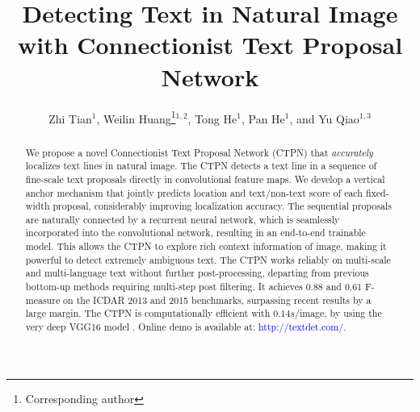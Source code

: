 \documentclass[runningheads]{llncs}
\begin{document}
\pagestyle{headings}
\mainmatter

\title{Detecting Text in Natural Image with Connectionist Text Proposal  Network} %



\author{Zhi Tian$^1$, Weilin Huang\thanks{Corresponding author}$^{1,2}$, Tong He$^1$, Pan He$^1$,  and Yu Qiao$^{1,3}$}



\maketitle

\begin{abstract}
We propose a novel Connectionist Text Proposal Network (CTPN) that  \textit{accurately} localizes text lines in natural image.  The CTPN detects a text line in a sequence of  fine-scale text proposals directly in convolutional feature maps.  We develop a vertical anchor mechanism that jointly predicts  location and text/non-text score  of each fixed-width proposal,   considerably improving localization accuracy. The sequential proposals  are naturally connected by a recurrent neural network, which is seamlessly incorporated into the convolutional network, resulting in an end-to-end trainable model. This allows the CTPN to explore rich context information of image, making it powerful to detect extremely ambiguous text.
The CTPN works reliably on multi-scale and multi-language text without further post-processing, departing from previous bottom-up methods requiring multi-step post filtering. It achieves 0.88 and 0.61 F-measure on the ICDAR 2013 and 2015 benchmarks, surpassing recent results \cite{Gupta2016,Zhang2016} by a large margin. The CTPN is computationally efficient with $0.14s/$image, by using the very deep VGG16 model \cite{Simonyan2015}. 
Online demo is available at: \textcolor{blue}{http://textdet.com/}. 

\end{abstract}
\end{document}
